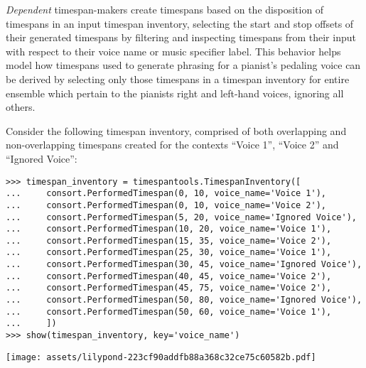 \emph{Dependent} timespan-makers create timespans based on the disposition of
timespans in an input timespan inventory, selecting the start and stop offsets
of their generated timespans by filtering and inspecting timespans from their
input with respect to their voice name or music specifier label. This behavior
helps model how timespans used to generate phrasing for a pianist's pedaling
voice can be derived by selecting only those timespans in a timespan inventory
for entire ensemble which pertain to the pianists right and left-hand voices,
ignoring all others.

Consider the following timespan inventory, comprised of both overlapping and
non-overlapping timespans created for the contexts \enquote{Voice 1},
\enquote{Voice 2} and \enquote{Ignored Voice}:

\begin{comment}
<abjad>
timespan_inventory = timespantools.TimespanInventory([
    consort.PerformedTimespan(0, 10, voice_name='Voice 1'),
    consort.PerformedTimespan(0, 10, voice_name='Voice 2'),
    consort.PerformedTimespan(5, 20, voice_name='Ignored Voice'),
    consort.PerformedTimespan(10, 20, voice_name='Voice 1'),
    consort.PerformedTimespan(15, 35, voice_name='Voice 2'),
    consort.PerformedTimespan(25, 30, voice_name='Voice 1'),
    consort.PerformedTimespan(30, 45, voice_name='Ignored Voice'),
    consort.PerformedTimespan(40, 45, voice_name='Voice 2'),
    consort.PerformedTimespan(45, 75, voice_name='Voice 2'),
    consort.PerformedTimespan(50, 80, voice_name='Ignored Voice'),
    consort.PerformedTimespan(50, 60, voice_name='Voice 1'),
    ])
show(timespan_inventory, key='voice_name')
</abjad>
\end{comment}

\begin{abjadbookoutput}
\begin{singlespacing}
\vspace{-0.5\baselineskip}
\begin{verbatim}
>>> timespan_inventory = timespantools.TimespanInventory([
...     consort.PerformedTimespan(0, 10, voice_name='Voice 1'),
...     consort.PerformedTimespan(0, 10, voice_name='Voice 2'),
...     consort.PerformedTimespan(5, 20, voice_name='Ignored Voice'),
...     consort.PerformedTimespan(10, 20, voice_name='Voice 1'),
...     consort.PerformedTimespan(15, 35, voice_name='Voice 2'),
...     consort.PerformedTimespan(25, 30, voice_name='Voice 1'),
...     consort.PerformedTimespan(30, 45, voice_name='Ignored Voice'),
...     consort.PerformedTimespan(40, 45, voice_name='Voice 2'),
...     consort.PerformedTimespan(45, 75, voice_name='Voice 2'),
...     consort.PerformedTimespan(50, 80, voice_name='Ignored Voice'),
...     consort.PerformedTimespan(50, 60, voice_name='Voice 1'),
...     ])
>>> show(timespan_inventory, key='voice_name')
\end{verbatim}
\noindent\texttt{[image: assets/lilypond-223cf90addfb88a368c32ce75c60582b.pdf]}
\end{singlespacing}
\end{abjadbookoutput}

